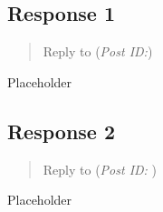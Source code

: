 \documentclass[12pt]{article}
\begin{document}
    \subsection{Response 1}
      \begin{quote}
        Reply to \textbf{} (\textit{Post ID:})
      \end{quote}
      Placeholder

    \subsection{Response 2}
      \begin{quote}
        Reply to \textbf{} (\textit{Post ID: }) 
      \end{quote}
      Placeholder


  \newpage
  \printbibliography[
    heading=bibintoc,
    title={Works Cited}
  ]
\end{document}

